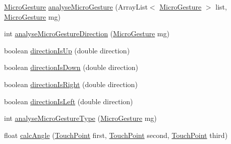 \begin{DoxyCompactItemize}
\item 
\hyperlink{classch_1_1zhaw_1_1ba10__bsha__1_1_1service_1_1MicroGesture}{MicroGesture} \hyperlink{classch_1_1zhaw_1_1ba10__bsha__1_1_1strategies_1_1MicroGestureDetectionStrategyPrediction_a741f6f5dfadc6a6ad25f03088ff55fc9}{analyseMicroGesture} (ArrayList$<$ \hyperlink{classch_1_1zhaw_1_1ba10__bsha__1_1_1service_1_1MicroGesture}{MicroGesture} $>$ list, \hyperlink{classch_1_1zhaw_1_1ba10__bsha__1_1_1service_1_1MicroGesture}{MicroGesture} mg)
\item 
int \hyperlink{classch_1_1zhaw_1_1ba10__bsha__1_1_1strategies_1_1MicroGestureDetectionStrategyPrediction_a756c6343fc5cb131a57b00f638ca1c3d}{analyseMicroGestureDirection} (\hyperlink{classch_1_1zhaw_1_1ba10__bsha__1_1_1service_1_1MicroGesture}{MicroGesture} mg)
\item 
boolean \hyperlink{classch_1_1zhaw_1_1ba10__bsha__1_1_1strategies_1_1MicroGestureDetectionStrategyPrediction_a9f38c05408d59c4d2211b249a402e0ff}{directionIsUp} (double direction)
\item 
boolean \hyperlink{classch_1_1zhaw_1_1ba10__bsha__1_1_1strategies_1_1MicroGestureDetectionStrategyPrediction_ac903a10ecc5d8bbf35d94b3675614dc9}{directionIsDown} (double direction)
\item 
boolean \hyperlink{classch_1_1zhaw_1_1ba10__bsha__1_1_1strategies_1_1MicroGestureDetectionStrategyPrediction_a41a97838c8b39eff1e6b50de7ca85d2e}{directionIsRight} (double direction)
\item 
boolean \hyperlink{classch_1_1zhaw_1_1ba10__bsha__1_1_1strategies_1_1MicroGestureDetectionStrategyPrediction_aab16f8d6aa8dbf56c71b04e299ae190a}{directionIsLeft} (double direction)
\item 
int \hyperlink{classch_1_1zhaw_1_1ba10__bsha__1_1_1strategies_1_1MicroGestureDetectionStrategyPrediction_a7a6bce4151aab292c0e6895257364601}{analyseMicroGestureType} (\hyperlink{classch_1_1zhaw_1_1ba10__bsha__1_1_1service_1_1MicroGesture}{MicroGesture} mg)
\item 
float \hyperlink{classch_1_1zhaw_1_1ba10__bsha__1_1_1strategies_1_1MicroGestureDetectionStrategyPrediction_a853328dde879f43b609cf85e698c64cf}{calcAngle} (\hyperlink{classch_1_1zhaw_1_1ba10__bsha__1_1_1TouchPoint}{TouchPoint} first, \hyperlink{classch_1_1zhaw_1_1ba10__bsha__1_1_1TouchPoint}{TouchPoint} second, \hyperlink{classch_1_1zhaw_1_1ba10__bsha__1_1_1TouchPoint}{TouchPoint} third)
\end{DoxyCompactItemize}
